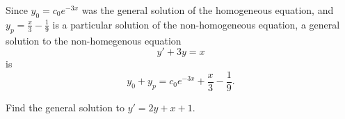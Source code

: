 \begin{applicationActivities}
\begin{observation}
Since \(y_0=c_0 e^{-3x}\) was the general solution of the homogeneous equation, and \(y_p = \frac{x}{3}-\frac{1}{9}\) is a particular solution of the non-homogeneous equation, a general solution to the non-homegenous equation  
\[y'+3y=x\]
is
\[y_0+y_p = c_0e^{-3x}+\frac{x}{3}-\frac{1}{9}.\]

\end{observation}

\begin{activity}{15}
Find the general solution to \(y'=2y+x+1\).
\end{activity}





\end{applicationActivities}
